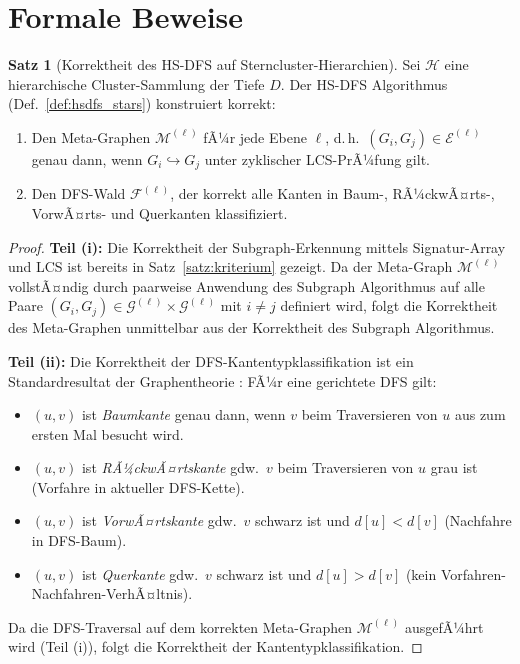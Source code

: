 ﻿\documentclass[a4paper,12pt]{report}
\theoremstyle{definition}
\newtheorem{satz}{Satz}
\begin{document}
\section{Formale Beweise}
\label{ssec:hsdfs_beweise}

\begin{satz}[Korrektheit des HS-DFS auf Sterncluster-Hierarchien]
\label{satz:hsdfs_korrektheit}
Sei $\mathcal{H}$ eine hierarchische Cluster-Sammlung der Tiefe $D$. Der HS-DFS Algorithmus (Def.~\ref{def:hsdfs_stars}) konstruiert korrekt:
\begin{enumerate}[label=(\roman*)]
    \item Den Meta-Graphen $\mathcal{M}^{(\ell)}$ fÃ¼r jede Ebene $\ell$, d.\,h.\ $(G_i, G_j) \in \mathcal{E}^{(\ell)}$ genau dann, wenn $G_i \hookrightarrow G_j$ unter zyklischer LCS-PrÃ¼fung gilt.
    \item Den DFS-Wald $\mathcal{F}^{(\ell)}$, der korrekt alle Kanten in Baum-, RÃ¼ckwÃ¤rts-, VorwÃ¤rts- und Querkanten klassifiziert.
\end{enumerate}
\end{satz}

\begin{proof}
\textbf{Teil (i):} Die Korrektheit der Subgraph-Erkennung mittels Signatur-Array und LCS ist bereits in Satz~\ref{satz:kriterium} gezeigt. Da der Meta-Graph $\mathcal{M}^{(\ell)}$ vollstÃ¤ndig durch paarweise Anwendung des Subgraph Algorithmus auf alle Paare $(G_i, G_j) \in \mathcal{G}^{(\ell)} \times \mathcal{G}^{(\ell)}$ mit $i \neq j$ definiert wird, folgt die Korrektheit des Meta-Graphen unmittelbar aus der Korrektheit des Subgraph Algorithmus.

\textbf{Teil (ii):} Die Korrektheit der DFS-Kantentypklassifikation ist ein Standardresultat der Graphentheorie \cite{cormen2009}: FÃ¼r eine gerichtete DFS gilt:
\begin{itemize}
    \item $(u,v)$ ist \emph{Baumkante} genau dann, wenn $v$ beim Traversieren von $u$ aus zum ersten Mal besucht wird.
    \item $(u,v)$ ist \emph{RÃ¼ckwÃ¤rtskante} gdw.\ $v$ beim Traversieren von $u$ grau ist (Vorfahre in aktueller DFS-Kette).
    \item $(u,v)$ ist \emph{VorwÃ¤rtskante} gdw.\ $v$ schwarz ist und $d[u] < d[v]$ (Nachfahre in DFS-Baum).
    \item $(u,v)$ ist \emph{Querkante} gdw.\ $v$ schwarz ist und $d[u] > d[v]$ (kein Vorfahren-Nachfahren-VerhÃ¤ltnis).
\end{itemize}
Da die DFS-Traversal auf dem korrekten Meta-Graphen $\mathcal{M}^{(\ell)}$ ausgefÃ¼hrt wird (Teil (i)), folgt die Korrektheit der Kantentypklassifikation.
\end{proof}
\end{document}
